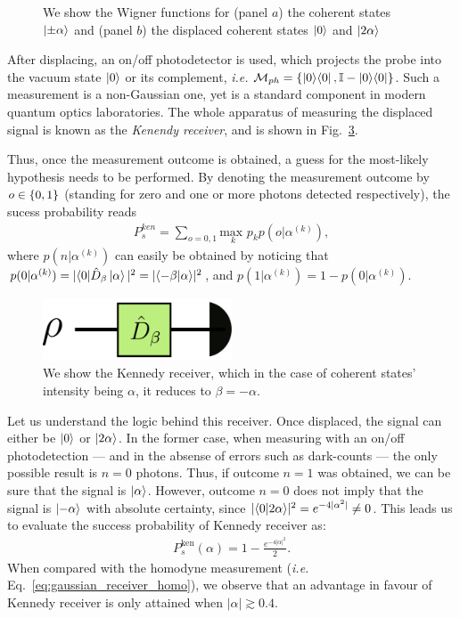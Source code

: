\begin{figure}[t!]
\begin{subfigure}[b]{0.49\textwidth}
         \caption{}
         \label{fig:312shiftsB}
     \end{subfigure}
 \caption{We show the Wigner functions for (panel $a$) the coherent states $\ket{\pm \alpha}$ and (panel $b$) the displaced coherent states $\ket{0}$ and $\ket{2 \alpha}$}
 \label{fig:312shifts}
 \end{figure}
After displacing, an on/off photodetector is used, which projects the probe into the vacuum state $\ket{0}$ or its complement, \textit{i.e.} $\mathcal{M}_{ph} = \llaves{\proj{0}, \mathbb{I}-\proj{0}}$. Such a measurement is a non-Gaussian one, yet is a standard component in modern quantum optics laboratories. The whole apparatus of measuring the displaced signal is known as the \textit{Kenendy receiver}, and is shown in Fig.~\ref{fig:kennedy_receiver}.

Thus, once the measurement outcome is obtained, a guess for the most-likely hypothesis needs to be performed. By denoting the measurement outcome by $o\in\lbrace 0,1\rbrace$ (standing for zero and one or more photons detected respectively), the sucess probability reads
\begin{align}
P^{ken}_s = \sum_{o=0,1} \underset{k}{\text{max }} p_k p(o|\alpha^{(k)}),
\end{align}
where $p(n|\alpha^{(k)})$ can easily be obtained by noticing that $p(0|\alpha^{(k)}) = |\langle 0 | \hat{D}_\beta \ket{\alpha}|^2 = |\langle -\beta | \alpha \rangle|^2$, and $p(1|\alpha^{(k)}) = 1- p(0|\alpha^{(k)})$.
\begin{figure}[b!]
    \centering
    \includegraphics[width=0.5\textwidth]{Figures/312/kennedy_receiver.pdf}
    \caption{We show the Kennedy receiver, which in the case of coherent states' intensity being $\alpha$, it reduces to $\beta = -\alpha$.}
    \label{fig:kennedy_receiver}
\end{figure}

Let us understand the logic behind this receiver. Once displaced, the signal can either be $\ket{0}$ or $\ket{2\alpha}$. In the former case, when measuring with an on/off photodetection --- and in the absense of errors such as dark-counts --- the only possible result is $n=0$ photons. Thus, if outcome $n=1$ was obtained, we can be sure that the signal is $\ket{\alpha}$. However, outcome $n=0$ does not imply that the signal is $\ket{-\alpha}$ with absolute certainty, since $|\langle 0 | 2\alpha \rangle|^2 = e^{-4|\alpha^2|}\neq0$. This leads us to evaluate the success probability of Kennedy receiver as:
\begin{align}\label{eq:ps_ken}
P_s^{\text{ken}}(\alpha) = 1 - \frac{e^{-4|\alpha|^2}}{2}.
\end{align}
When compared with the homodyne measurement (\textit{i.e.} Eq.~\ref{eq:gaussian_receiver_homo}), we observe that an advantage in favour of Kennedy receiver is only attained when $|\alpha| \gtrsim 0.4$.

